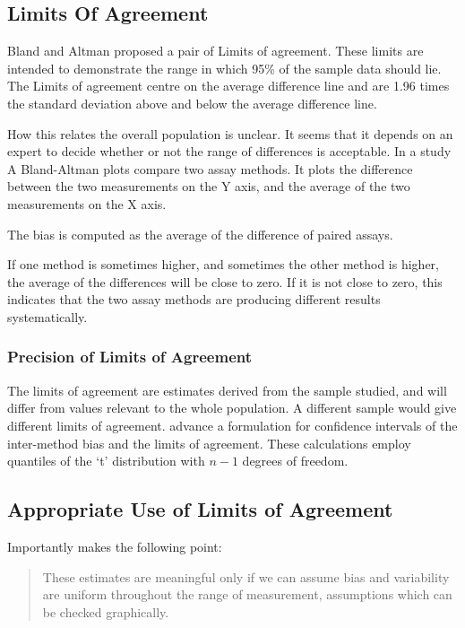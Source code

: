 \documentclass[Main.tex]{subfiles}
\begin{document}
	\subsection{Limits Of Agreement}
	Bland and Altman proposed a pair of Limits of agreement. These
	limits are intended to demonstrate the range in which 95\% of the
	sample data should lie. The Limits of agreement centre on the
	average difference line and are 1.96 times the standard deviation
	above and below the average difference line.
	
	How this relates the overall population is unclear. It seems that
	it depends on an expert to decide whether or not the range of
	differences is acceptable. In a study A Bland-Altman plots compare
	two assay methods. It plots the difference between the two
	measurements on the Y axis, and the average of the two
	measurements on the X axis.
	
	The bias is computed as the average of the difference of paired
	assays.
	
	If one method is sometimes higher, and sometimes the other method
	is higher, the average of the differences will be close to zero.
	If it is not close to zero, this indicates that the two assay
	methods are producing different results systematically.
	
	\subsubsection{Precision of Limits of Agreement}
	The limits of agreement are estimates derived from the sample
	studied, and will differ from values relevant to the whole
	population. A different sample would give different limits of
	agreement. \citet*{BA86} advance a formulation for confidence
	intervals of the inter-method bias and the limits of agreement.
	These calculations employ quantiles of the `t' distribution with
	$n -1$ degrees of freedom.
	
	\subsection{Appropriate Use of Limits of Agreement}
	Importantly \citet{BA99} makes the following point:
	\begin{quote}These estimates are meaningful only if we can assume
		bias and variability are uniform throughout the range of
		measurement, assumptions which can be checked graphically.
	\end{quote}
	
\end{document}
